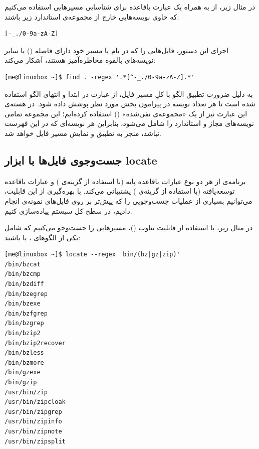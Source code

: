 در مثال زیر، از  به همراه یک عبارت باقاعده برای شناسایی مسیرهایی استفاده می‌کنیم که حاوی نویسه‌هایی خارج از مجموعه‌ی استاندارد زیر باشند:

\begin{latin}
\begin{lstlisting}
[-_./0-9a-zA-Z]
\end{lstlisting}
\end{latin}

اجرای این دستور، فایل‌هایی را که در نام یا مسیر خود دارای فاصله () یا سایر نویسه‌های بالقوه مخاطره‌آمیز هستند، آشکار می‌کند:

\begin{latin}
\begin{lstlisting}
[me@linuxbox ~]$ find . -regex '.*[^-_./0-9a-zA-Z].*'
\end{lstlisting}
\end{latin}

به دلیل ضرورت تطبیق الگو با کلِ مسیر فایل، از عبارت  در ابتدا و انتهای الگو استفاده شده است تا هر تعداد نویسه در پیرامون بخش مورد نظر پوشش داده شود. در هسته‌ی این عبارت نیز از یک «مجموعه‌ی نفی‌شده» () استفاده کرده‌ایم؛ این مجموعه تمامی نویسه‌های مجاز و استاندارد را شامل می‌شود، بنابراین هر نویسه‌ای که در این فهرست نباشد، منجر به تطبیق و نمایش مسیر فایل خواهد شد.

\subsection{جست‌وجوی فایل‌ها با ابزار locate}

برنامه‌ی  از هر دو نوع عبارات باقاعده پایه (با استفاده از گزینه‌ی ) و عبارات باقاعده توسعه‌یافته (با استفاده از گزینه‌ی ) پشتیبانی می‌کند. با بهره‌گیری از این قابلیت، می‌توانیم بسیاری از عملیات جست‌وجویی را که پیش‌تر بر روی فایل‌های نمونه‌ی  انجام دادیم، در سطح کل سیستم پیاده‌سازی کنیم.

در مثال زیر، با استفاده از قابلیت تناوب ()، مسیرهایی را جست‌وجو می‌کنیم که شامل یکی از الگوهای ،  یا  باشند:

\begin{latin}
\begin{lstlisting}
[me@linuxbox ~]$ locate --regex 'bin/(bz|gz|zip)'
/bin/bzcat
/bin/bzcmp
/bin/bzdiff
/bin/bzegrep
/bin/bzexe
/bin/bzfgrep
/bin/bzgrep
/bin/bzip2
/bin/bzip2recover
/bin/bzless
/bin/bzmore
/bin/gzexe
/bin/gzip
/usr/bin/zip
/usr/bin/zipcloak
/usr/bin/zipgrep
/usr/bin/zipinfo
/usr/bin/zipnote
/usr/bin/zipsplit
\end{lstlisting}
\end{latin}

